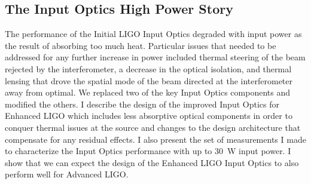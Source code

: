 


\subsection{The Input Optics High Power Story} 
The performance of the Initial LIGO Input Optics degraded with input
power as the result of absorbing too much heat. Particular
issues that needed to be addressed for any further increase in power
included thermal steering of the beam rejected by the interferometer,
a decrease in the optical isolation, and thermal lensing that drove
the spatial mode of the beam directed at the interferometer away from
optimal. We replaced two of the key Input Optics components and
modified the others. I describe the design of the improved Input
Optics for Enhanced LIGO which includes less absorptive optical
components in order to conquer thermal issues at the source and
changes to the design architecture that compensate for any residual
effects. I also present the set of measurements I made to characterize
the Input Optics performance with up to 30~W input power. I show that
we can expect the design of the Enhanced LIGO Input Optics to also
perform well for Advanced LIGO.



